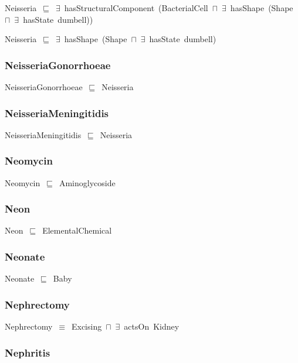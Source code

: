 \documentclass{article}
\begin{document}
Neisseria~\ensuremath{\sqsubseteq}~\ensuremath{\exists}~hasStructuralComponent~(BacterialCell~\ensuremath{\sqcap}~\ensuremath{\exists}~hasShape~(Shape~\ensuremath{\sqcap}~\ensuremath{\exists}~hasState~dumbell))~

Neisseria~\ensuremath{\sqsubseteq}~\ensuremath{\exists}~hasShape~(Shape~\ensuremath{\sqcap}~\ensuremath{\exists}~hasState~dumbell)~

\subsubsection*{NeisseriaGonorrhoeae}

NeisseriaGonorrhoeae~\ensuremath{\sqsubseteq}~Neisseria~

\subsubsection*{NeisseriaMeningitidis}

NeisseriaMeningitidis~\ensuremath{\sqsubseteq}~Neisseria~

\subsubsection*{Neomycin}

Neomycin~\ensuremath{\sqsubseteq}~Aminoglycoside~

\subsubsection*{Neon}

Neon~\ensuremath{\sqsubseteq}~ElementalChemical~

\subsubsection*{Neonate}

Neonate~\ensuremath{\sqsubseteq}~Baby~

\subsubsection*{Nephrectomy}

Nephrectomy~\ensuremath{\equiv}~Excising~\ensuremath{\sqcap}~\ensuremath{\exists}~actsOn~Kidney

\subsubsection*{Nephritis}
\end{document}
